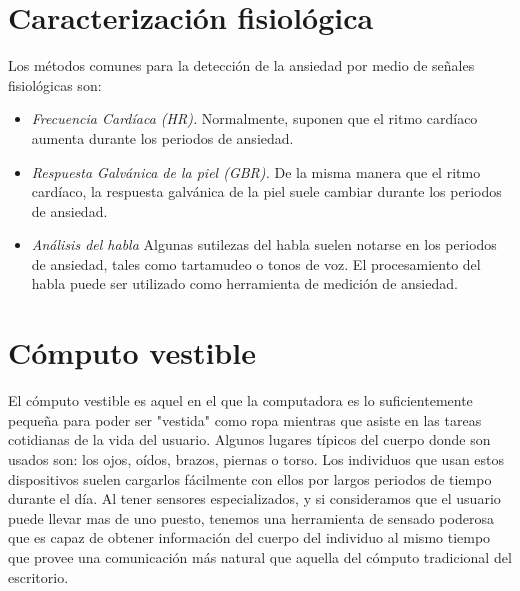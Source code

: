 \documentclass[letterpaper,12pt]{cicese}
\begin{document}
			\section{Caracterizaci\'on fisiol\'ogica}
				Los m\'etodos comunes para la detecci\'on de la ansiedad  por medio de se\~nales fisiol\'ogicas son: 
					\begin{itemize}
						\item \emph{Frecuencia Card\'iaca (HR).} Normalmente, suponen que el ritmo card\'iaco aumenta durante los periodos de ansiedad. 
						\item \emph{Respuesta Galv\'anica de la piel (GBR).} De la misma manera que el ritmo card\'iaco, la respuesta galv\'anica de la piel suele cambiar durante los periodos de ansiedad.
						\item \emph{An\'alisis del habla} Algunas sutilezas del habla suelen notarse en los periodos de ansiedad, tales como tartamudeo o tonos de voz.
						El procesamiento del habla puede  ser utilizado como herramienta de medici\'on de ansiedad.
					\end{itemize}
			\section{C\'omputo vestible}
				El c\'omputo vestible es aquel en el que la computadora es lo suficientemente peque\~na para poder ser "vestida" como ropa mientras que asiste en las
				tareas cotidianas de la vida del usuario\citep{Starner97augmentedreality}. Algunos lugares t\'ipicos del cuerpo donde son usados son: los ojos, o\'idos, brazos, piernas o torso.
				Los individuos que usan estos dispositivos suelen cargarlos f\'acilmente con ellos por largos periodos de tiempo durante el d\'ia. Al tener sensores
				especializados, y si consideramos que el usuario puede llevar mas de uno puesto, tenemos una herramienta de sensado poderosa que es capaz de obtener
				informaci\'on del cuerpo del individuo al mismo tiempo que provee una comunicaci\'on m\'as natural que aquella del c\'omputo tradicional del escritorio.
\end{document}
